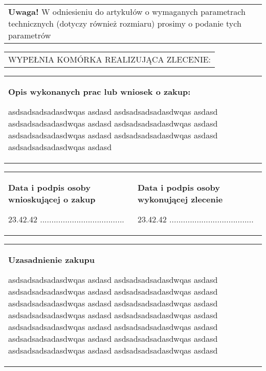 \documentclass[11pt,a4paper]{article}
\begin{document}
\begin{tabularx}{\linewidth}{|X|}
{\tiny \textbf{Uwaga!} W odniesieniu do artykułów o wymaganych parametrach technicznych (dotyczy również rozmiaru) prosimy o podanie tych parametrów}
\end{tabularx}

\begin{tabularx}{\linewidth}{|X|}
\hline
\rowcolor[gray]{.7}
WYPEŁNIA KOMÓRKA REALIZUJĄCA ZLECENIE:
\end{tabularx}

\begin{tabularx}{\linewidth}{|X|}
\hline
{\footnotesize \textbf{Opis wykonanych prac lub wniosek o zakup:}}\newline

{} asdsadsadsadasdwqas asdasd asdsadsadsadasdwqas asdasd asdsadsadsadasdwqas asdasd asdsadsadsadasdwqas asdasd asdsadsadsadasdwqas asdasd asdsadsadsadasdwqas asdasd asdsadsadsadasdwqas asdasd 

\\
\end{tabularx}

\begin{tabularx}{\linewidth}{|X|X|}
\hline
{\footnotesize \textbf{Data i podpis osoby wnioskującej o zakup}} \newline

{} 23.42.42 \hspace{1cm} .....................................

&
{\footnotesize \textbf{Data i podpis osoby wykonującej zlecenie}} \newline

{} 23.42.42 \hspace{1cm} .....................................


\end{tabularx}



\begin{tabularx}{\linewidth}{|X|}
\hline

{\footnotesize \textbf{Uzasadnienie zakupu}}\newline

{} asdsadsadsadasdwqas asdasd asdsadsadsadasdwqas asdasd asdsadsadsadasdwqas asdasd asdsadsadsadasdwqas asdasd asdsadsadsadasdwqas asdasd asdsadsadsadasdwqas asdasd asdsadsadsadasdwqas asdasd asdsadsadsadasdwqas asdasd asdsadsadsadasdwqas asdasd asdsadsadsadasdwqas asdasd asdsadsadsadasdwqas asdasd asdsadsadsadasdwqas asdasd asdsadsadsadasdwqas asdasd asdsadsadsadasdwqas asdasd 

\end{tabularx}
\end{document}
